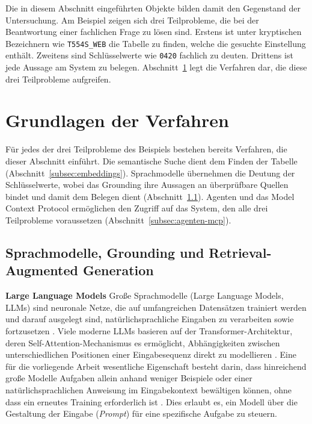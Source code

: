 Die in diesem Abschnitt eingeführten Objekte bilden damit den Gegenstand der Untersuchung. Am Beispiel zeigen sich drei Teilprobleme, die bei der Beantwortung einer fachlichen Frage zu lösen sind. Erstens ist unter kryptischen Bezeichnern wie \texttt{T554S\_WEB} die Tabelle zu finden, welche die gesuchte Einstellung enthält. Zweitens sind Schlüsselwerte wie \texttt{0420} fachlich zu deuten. Drittens ist jede Aussage am System zu belegen. Abschnitt~\ref{sec:verfahren} legt die Verfahren dar, die diese drei Teilprobleme aufgreifen.

\section{Grundlagen der Verfahren}
\label{sec:verfahren}

Für jedes der drei Teilprobleme des Beispiels bestehen bereits Verfahren, die dieser Abschnitt einführt. Die semantische Suche dient dem Finden der Tabelle (Abschnitt~\ref{subsec:embeddings}). Sprachmodelle übernehmen die Deutung der Schlüsselwerte, wobei das Grounding ihre Aussagen an überprüfbare Quellen bindet und damit dem Belegen dient (Abschnitt~\ref{subsec:llm-grounding}). Agenten und das Model Context Protocol ermöglichen den Zugriff auf das System, den alle drei Teilprobleme voraussetzen (Abschnitt~\ref{subsec:agenten-mcp}).

\subsection{Sprachmodelle, Grounding und Retrieval-Augmented Generation}
\label{subsec:llm-grounding}

\textbf{Large Language Models}
Große Sprachmodelle (Large Language Models, LLMs) sind neuronale Netze, die auf umfangreichen Datensätzen trainiert werden und darauf ausgelegt sind, natürlichsprachliche Eingaben zu verarbeiten sowie fortzusetzen \cite{zhao_survey_2026}. Viele moderne LLMs basieren auf der Transformer-Architektur, deren Self-Attention-Mechanismus es ermöglicht, Abhängigkeiten zwischen unterschiedlichen Positionen einer Eingabesequenz direkt zu modellieren \cite{vaswani_attention_2023}. Eine für die vorliegende Arbeit wesentliche Eigenschaft besteht darin, dass hinreichend große Modelle Aufgaben allein anhand weniger Beispiele oder einer natürlichsprachlichen Anweisung im Eingabekontext bewältigen können, ohne dass ein erneutes Training erforderlich ist \cite{brown_language_2020}. Dies erlaubt es, ein Modell über die Gestaltung der Eingabe (\emph{Prompt}) für eine spezifische Aufgabe zu steuern.

